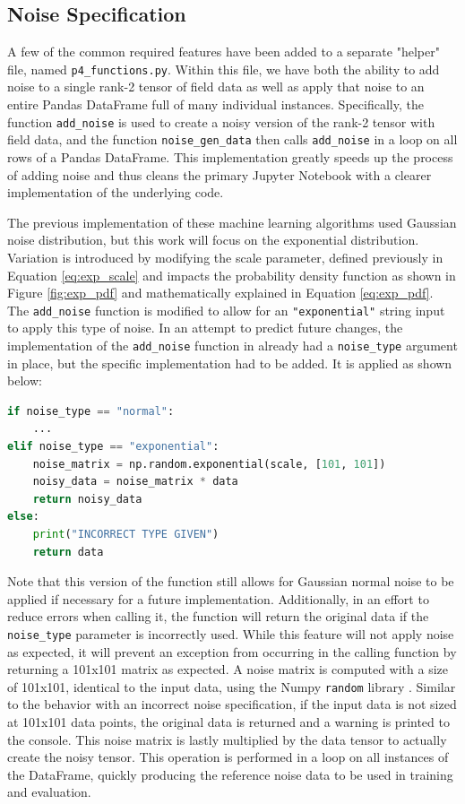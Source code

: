 \documentclass[conference]{IEEEtran}
\begin{document}
\subsection{Noise Specification} 
A few of the common required features have been added to a separate "helper" file, named \verb*|p4_functions.py|.
Within this file, we have both the ability to add noise to a single rank-2 tensor of field data as well as apply that noise to an entire Pandas DataFrame full of many individual instances.
Specifically, the function \verb*|add_noise| is used to create a noisy version of the rank-2 tensor with field data, and the function \verb*|noise_gen_data| then calls \verb*|add_noise| in a loop on all rows of a Pandas DataFrame. 
This implementation greatly speeds up the process of adding noise and thus cleans the primary Jupyter Notebook with a clearer implementation of the underlying code.

The previous implementation of these machine learning algorithms used Gaussian noise distribution, but this work will focus on the exponential distribution.
Variation is introduced by modifying the scale parameter, defined previously in Equation \ref{eq:exp_scale} and impacts the probability density function as shown in Figure \ref{fig:exp_pdf} and mathematically explained in Equation \ref{eq:exp_pdf}.
The \verb*|add_noise| function is modified to allow for an \verb*|"exponential"| string input to apply this type of noise.
In an attempt to predict future changes, the implementation of the \verb*|add_noise| function in \cite{newberry_machine_2022-1} already had a \verb*|noise_type| argument in place, but the specific implementation had to be added. 
It is applied as shown below:

\begin{lstlisting}[language=python]
if noise_type == "normal":
	...
elif noise_type == "exponential":
	noise_matrix = np.random.exponential(scale, [101, 101])
	noisy_data = noise_matrix * data
	return noisy_data
else:
	print("INCORRECT TYPE GIVEN")
	return data
\end{lstlisting}

Note that this version of the function still allows for Gaussian normal noise to be applied if necessary for a future implementation.
Additionally, in an effort to reduce errors when calling it, the function will return the original data if the \verb*|noise_type| parameter is incorrectly used. 
While this feature will not apply noise as expected, it will prevent an exception from occurring in the calling function by returning a 101x101 matrix as expected.
A noise matrix is computed with a size of 101x101, identical to the input data, using the Numpy \verb*|random| library \cite{noauthor_random_nodate}.
Similar to the behavior with an incorrect noise specification, if the input data is not sized at 101x101 data points, the original data is returned and a warning is printed to the console.
This noise matrix is lastly multiplied by the data tensor to actually create the noisy tensor.
This operation is performed in a loop on all instances of the DataFrame, quickly producing the reference noise data to be used in training and evaluation.
\end{document}
